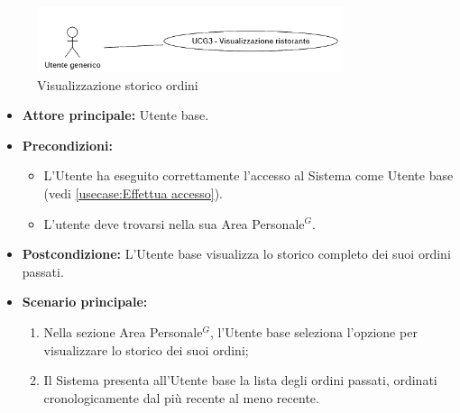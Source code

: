 \label{usecase:Storico ordini}

\begin{figure}[h]
	\centering
	\includegraphics[width=0.8\textwidth]{./uml/UCG3.png} 
	\caption{Visualizzazione storico ordini}
	\label{fig:UCG3}
  \end{figure}

\begin{itemize}
	\item \textbf{Attore principale:} Utente base.

	\item \textbf{Precondizioni:}
	      \begin{itemize}
		      \item L'Utente ha eseguito correttamente l'accesso al Sistema come Utente base (vedi \autoref{usecase:Effettua accesso}).
		      \item L'utente deve trovarsi nella sua Area Personale$^G$.
	      \end{itemize}

	\item \textbf{Postcondizione:} L'Utente base visualizza lo storico completo dei suoi ordini passati.

	\item \textbf{Scenario principale:}
	      \begin{enumerate}
		      \item Nella sezione Area Personale$^G$, l'Utente base seleziona l'opzione per visualizzare lo storico dei suoi ordini;
		      \item Il Sistema presenta all'Utente base la lista degli ordini passati, ordinati cronologicamente dal più recente al meno recente.
	      \end{enumerate}
\end{itemize}

